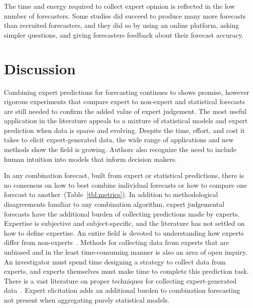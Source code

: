 \documentclass[preprint,authoryear]{elsarticle}
\begin{document}
The time and energy required to collect expert opinion is reflected in the low number of forecasters. 
Some studies did succeed to produce many more forecasts than recruited forecasters, and they did so by using an online platform, asking simpler questions, and giving forecasters feedback about their forecast accuracy.

\section{Discussion}


\label{sec.discussion}

Combining expert predictions for forecasting continues to shows promise, however rigorous experiments that compare expert to non-expert and statistical forecasts are still needed to confirm the added value of expert judgement.
The most useful application in the literature appeals to a mixture of statistical models and expert prediction when data is sparse and evolving.
Despite the time, effort, and cost it takes to elicit expert-generated data, the wide range of applications and new methods show the field is growing.
Authors also recognize the need to include human intuition into models that inform decision makers.

In any combination forecast, built from expert or statistical predictions, there is no consensus on how to best combine individual forecasts or how to compare one forecast to another~(Table~\ref{tbl.metrics}).
In addition to methodological disagreements familiar to any combination algorithm, expert judgemental forecasts have the additional burden of collecting predictions made by experts.
Expertise is subjective and subject-specific, and the literature has not settled on how to define expertise.
An entire field is devoted to understanding how experts differ from non-experts~\citep{dawid1995coherent,farrington2006nature,ericsson2007capturing,rikers2005recent,de2014thought}.
Methods for collecting data from experts that are unbiased and in the least time-consuming manner is also an area of open inquiry.
An investigator must spend time designing a strategy to collect data from experts, and experts themselves must make time to complete this prediction task. 
There is a vast literature on proper techniques for collecting expert-generated data~\citep{ayyub2001elicitation,yousuf2007using,powell2003delphi,normand1998eliciting,leal2007eliciting,martin2012eliciting}.
Expert elicitation adds an additional burden to combination forecasting not present when aggregating purely statistical models.
\end{document}
